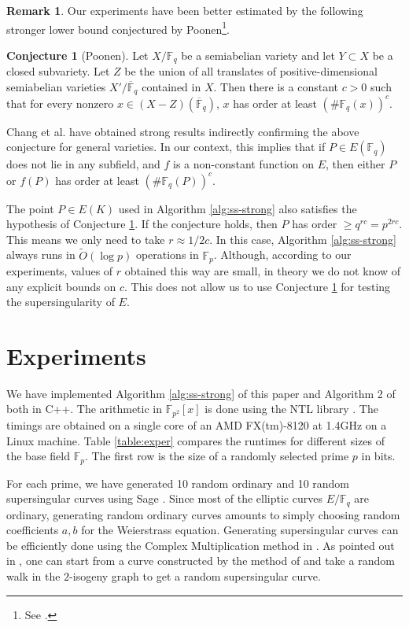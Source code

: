 \documentclass[12pt]{article}
\theoremstyle{plain}
\theoremstyle{definition}
\newtheorem{conjecture}[theorem]{Conjecture}
\newtheorem*{remark}{Remark}
\newcommand{\tildO}{\tilde{O}}
\def\F{\ensuremath{\mathbb{F}}}
\begin{document}
\begin{remark}
	Our experiments have been better estimated by the following stronger lower bound conjectured by 
	Poonen\footnote{See \cite{voloch2007}.}.
	\begin{conjecture}[Poonen]
		\label{conj:poonen}
		Let $X/\F_q$ be a semiabelian variety and let $Y \subset X$ be a closed subvariety. Let $Z$ 
		be the union of all translates of positive-dimensional semiabelian varieties $X' / 
		\overline{\F}_q$ contained in $X$. Then there is a constant $c > 0$ such that for every 
		nonzero $x \in (X - Z)(\overline{\F}_q)$, $x$ has order at least $(\#\F_q(x))^c$.
	\end{conjecture}
	Chang et al.\cite{chang2014} have obtained strong results indirectly confirming the above 
	conjecture for general varieties. In our context, this implies that if $P \in E(\F_q)$ does 
	not lie in any subfield, and $f$ is a non-constant function on $E$, then either $P$ or $f(P)$ 
	has order at least $(\#\F_q(P))^c$. 
	
	The point $P \in E(K)$ used in Algorithm \ref{alg:ss-strong} also satisfies the hypothesis of 
	Conjecture \ref{conj:poonen}. If the conjecture holds, then $P$ has order $\ge q^{rc} = 
	p^{2rc}$. This means we only need to take $r \approx 1 / 2c$. In this case, Algorithm 
	\ref{alg:ss-strong} always runs in $\tildO(\log p)$ operations in $\F_p$. Although, according 
	to our experiments, values of $r$ obtained this way are small, in theory we do not know of any 
	explicit bounds on $c$. This does not allow us to use Conjecture \ref{conj:poonen} for testing 
	the supersingularity of $E$.
\end{remark}




\section{Experiments}

We have implemented Algorithm \ref{alg:ss-strong} of this paper and Algorithm 2 of 
\cite{sutherland2012} both in C++. The arithmetic in $\F_{p^2}[x]$ is done using the NTL library 
\cite{shoup2001ntl}. The timings are obtained on a single core of an AMD FX(tm)-8120 at 1.4GHz on a 
Linux machine. Table \ref{table:exper} compares the runtimes for different sizes of the base field 
$\F_p$. The first row is the size of a randomly selected prime $p$ in bits. 

For each prime, we have generated 10 random ordinary and 10 random supersingular curves using Sage 
\cite{stein2008sage}. Since most of the elliptic curves $E/\F_q$ are ordinary, generating random 
ordinary curves amounts to simply choosing random coefficients $a, b$ for the Weierstrass equation. 
Generating supersingular curves can be efficiently done using the Complex Multiplication 
method in \cite{broker2009}. As pointed out in \cite{sutherland2012}, one can start from a curve 
constructed by the method of \cite{broker2009} and take a random walk in the $2$-isogeny graph to 
get a random supersingular curve.
\end{document}
